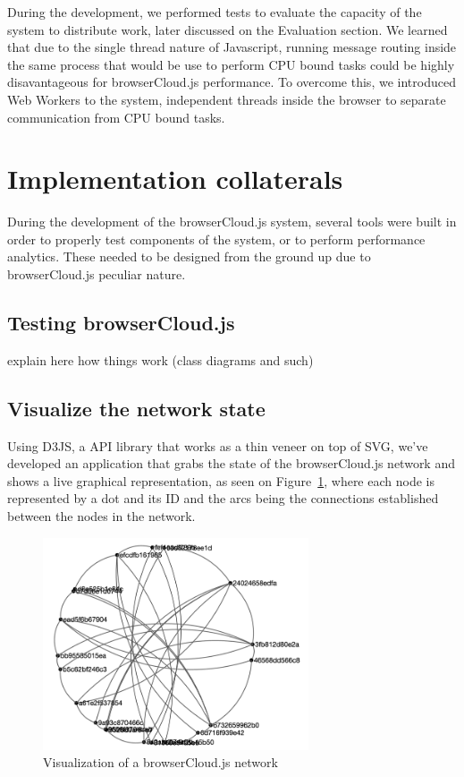 During the development, we performed tests to evaluate the capacity of the system to distribute work, later discussed on the Evaluation section. We learned that due to the single thread nature of Javascript, running message routing inside the same process that would be use to perform CPU bound tasks could be highly disavantageous for browserCloud.js performance. To overcome this, we introduced Web Workers to the system, independent threads inside the browser to separate communication from CPU bound tasks.

\section{Implementation collaterals}

During the development of the browserCloud.js system, several tools were built in order to properly test components of the system, or to perform performance analytics. These needed to be designed from the ground up due to browserCloud.js peculiar nature.

\subsection{Testing browserCloud.js}

explain here how things work (class diagrams and such)

\subsection{Visualize the network state}

Using D3JS, a API library that works as a thin veneer on top of SVG, we've developed an application that grabs the state of the browserCloud.js network and shows a live graphical representation, as seen on Figure~\ref{fig:visualizer}, where each node is represented by a dot and its ID and the arcs being the connections established between the nodes in the network.

\begin{figure}[h!]
  \centering
  \includegraphics[width=0.7\textwidth]{figs/visualizer}
  \caption{Visualization of a browserCloud.js network}
  \label{fig:visualizer}
\end{figure}

